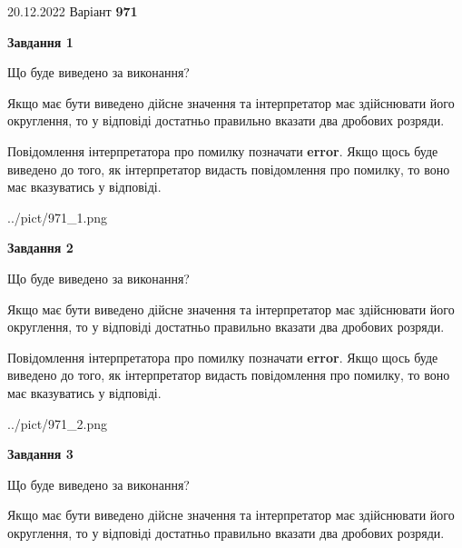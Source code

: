 \documentclass[12pt, ukrainian]{article}
\begin{document}
{20.12.2022 Варіант \No \textbf { 971 }\par}
{
\begin {Large}

{\begin {center}\textbf{Завдання 1}\end {center}}\par
Що буде виведено за виконання? \par

Якщо має бути виведено дійсне значення та інтерпретатор має здійснювати його округлення, 
то у відповіді достатньо правильно вказати два дробових розряди.

Повідомлення інтерпретатора про помилку позначати \textbf{error}.
Якщо щось буде виведено до того, як інтерпретатор видасть повідомлення про помилку, 
то воно має вказуватись у відповіді. \par

\begin{center}
	{../pict/971_1.png}
\end{center}
\newpage

{\begin {center}\textbf{Завдання 2}\end {center}}\par
Що буде виведено за виконання? \par

Якщо має бути виведено дійсне значення та інтерпретатор має здійснювати його округлення, 
то у відповіді достатньо правильно вказати два дробових розряди.

Повідомлення інтерпретатора про помилку позначати \textbf{error}.
Якщо щось буде виведено до того, як інтерпретатор видасть повідомлення про помилку, 
то воно має вказуватись у відповіді. \par

\begin{center}
	{../pict/971_2.png}
\end{center}
\newpage

{\begin {center}\textbf{Завдання 3}\end {center}}\par
Що буде виведено за виконання? \par

Якщо має бути виведено дійсне значення та інтерпретатор має здійснювати його округлення, 
то у відповіді достатньо правильно вказати два дробових розряди.


\end{Large}}
\end{document}
